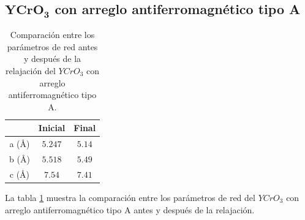 \subsection{$\mathbf{YCrO_{3}}$ con arreglo antiferromagn\'etico tipo A}

\begin{table}[H]
    \begin{center}
        \caption{Comparaci\'on entre los par\'ametros de red antes y despu\'es 
            de la relajaci\'on del $YCrO_{3}$ con arreglo antiferromagn\'etico 
            tipo A.}
        \begin{tabular}{ccc}
            \hline
            & \textbf{Inicial} \cite{geller1956} & \textbf{Final} \\
            \hline \hline
            a (\AA) & $5.247$  & $5.14$   \\
            \hline
            b (\AA) & $5.518$ & $5.49$   \\
            \hline
            c (\AA) & $7.54$ & $7.41$   \\
            \hline
        \end{tabular}
        \singlespace
        \label{yco_a_ini_fin}
    \end{center}
\end{table}

\noindent La tabla \ref{yco_a_ini_fin} muestra la comparaci\'on entre los 
par\'ametros de red del $YCrO_{3}$ con arreglo antiferromagn\'etico tipo A 
antes y despu\'es de la relajaci\'on.

